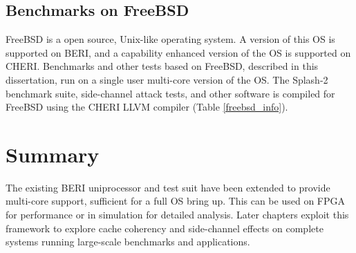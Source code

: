 		\begin{comment}
		Copyright (c) 1992-2014 The FreeBSD Project.
		Copyright (c) 1979, 1980, 1983, 1986, 1988, 1989, 1991, 1992, 1993, 1994
			The Regents of the University of California. All rights reserved.
		FreeBSD is a registered trademark of The FreeBSD Foundation.
		FreeBSD 11.0-CURRENT #0 c2208dd(master): Mon Dec 15 16:35:59 UTC 2014
		\end{comment}

	\subsection{Benchmarks on FreeBSD}
		\label{freebsd_setup}
		FreeBSD is a open source, Unix-like operating system. A version of this OS is supported on BERI, and a capability enhanced version of the OS is supported on CHERI. Benchmarks and other tests based on FreeBSD, described in this dissertation, run on a single user multi-core version of the OS. The Splash-2 benchmark suite, side-channel attack tests, and other software is compiled for FreeBSD using the CHERI LLVM compiler \cite{Chisnall15,Chisnall14} (Table \ref{freebsd_info}).
		
	\section{Summary}
		The existing BERI uniprocessor and test suit have been extended to provide multi-core support, sufficient for a full OS bring up. This can be used on FPGA for performance or in simulation for detailed analysis. Later chapters exploit this framework to explore cache coherency and side-channel effects on complete systems running large-scale benchmarks and applications.
		
		
		
		
		
		
		
		
		
		
		
		
		
